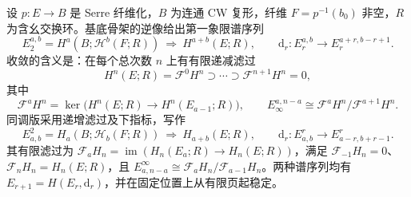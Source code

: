 \begin{theorem}\label{g2:thm:serre-spectral-sequence}
	设 \(p:E\to B\) 是 Serre 纤维化，\(B\) 为连通 CW 复形，纤维 \(F=p^{-1}(b_0)\) 非空，\(R\) 为含幺交换环。基底骨架的逆像给出第一象限谱序列
	\begin{equation}\label{g2:eq:serre-cohomology-e2}
		E_2^{a,b}=H^a(B;\mathcal H^b(F;R))\ \Longrightarrow\ H^{a+b}(E;R),\qquad
		\mathrm d_r:E_r^{a,b}\longrightarrow E_r^{a+r,b-r+1}.
	\end{equation}
	收敛的含义是：在每个总次数 \(n\) 上有有限递减滤过
	\[
		H^n(E;R)=\mathcal F^0H^n\supset\cdots\supset\mathcal F^{n+1}H^n=0,
	\]
	其中
	\begin{equation}\label{g2:eq:serre-target-filtration}
		\mathcal F^aH^n=\ker\bigl(H^n(E;R)\longrightarrow H^n(E_{a-1};R)\bigr),
		\qquad E_\infty^{a,n-a}\cong\mathcal F^aH^n/\mathcal F^{a+1}H^n.
	\end{equation}
	同调版采用递增滤过及下指标，写作
	\begin{equation}\label{g2:eq:serre-homology-e2}
		E^2_{a,b}=H_a(B;\mathcal H_b(F;R))\ \Longrightarrow\ H_{a+b}(E;R),\qquad
		\mathrm d_r:E^r_{a,b}\longrightarrow E^r_{a-r,b+r-1}.
	\end{equation}
	其有限滤过为 \(\mathcal F_aH_n=\operatorname{im}(H_n(E_a;R)\to H_n(E;R))\)，满足 \(\mathcal F_{-1}H_n=0\)、\(\mathcal F_nH_n=H_n(E;R)\)，且 \(E^\infty_{a,n-a}\cong\mathcal F_aH_n/\mathcal F_{a-1}H_n\)。两种谱序列均有 \(E_{r+1}=H(E_r,\mathrm d_r)\)，并在固定位置上从有限页起稳定。
\end{theorem}
